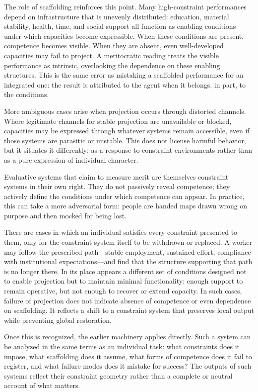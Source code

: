 \documentclass[12pt, a4paper]{article}
\begin{document}
The role of scaffolding reinforces this point. Many high-constraint performances depend on infrastructure that is unevenly distributed: education, material stability, health, time, and social support all function as enabling conditions under which capacities become expressible. When these conditions are present, competence becomes visible. When they are absent, even well-developed capacities may fail to project. A meritocratic reading treats the visible performance as intrinsic, overlooking the dependence on these enabling structures. This is the same error as mistaking a scaffolded performance for an integrated one: the result is attributed to the agent when it belongs, in part, to the conditions.

More ambiguous cases arise when projection occurs through distorted channels. Where legitimate channels for stable projection are unavailable or blocked, capacities may be expressed through whatever systems remain accessible, even if those systems are parasitic or unstable. This does not license harmful behavior, but it situates it differently: as a response to constraint environments rather than as a pure expression of individual character.

Evaluative systems that claim to measure merit are themselves constraint systems in their own right. They do not passively reveal competence; they actively define the conditions under which competence can appear. In practice, this can take a more adversarial form: people are handed maps drawn wrong on purpose and then mocked for being lost.

There are cases in which an individual satisfies every constraint presented to them, only for the constraint system itself to be withdrawn or replaced. A worker may follow the prescribed path---stable employment, sustained effort, compliance with institutional expectations---and find that the structure supporting that path is no longer there. In its place appears a different set of conditions designed not to enable projection but to maintain minimal functionality: enough support to remain operative, but not enough to recover or extend capacity. In such cases, failure of projection does not indicate absence of competence or even dependence on scaffolding. It reflects a shift to a constraint system that preserves local output while preventing global restoration.

Once this is recognized, the earlier machinery applies directly. Such a system can be analyzed in the same terms as an individual task: what constraints does it impose, what scaffolding does it assume, what forms of competence does it fail to register, and what failure modes does it mistake for success? The outputs of such systems reflect their constraint geometry rather than a complete or neutral account of what matters.
\end{document}
